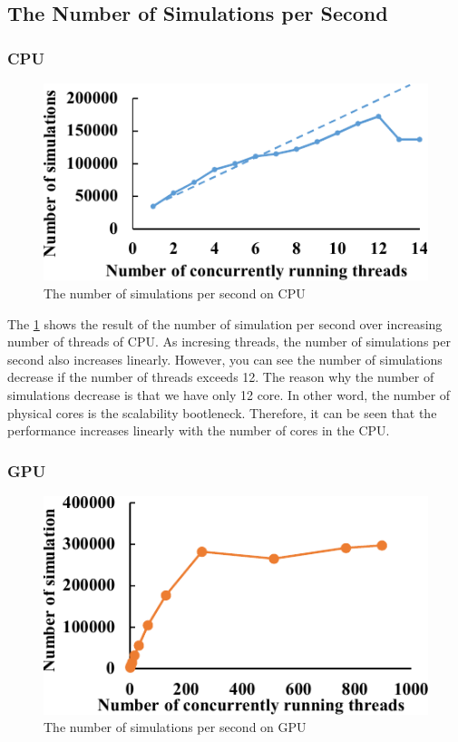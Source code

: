 \documentclass[conference]{IEEEtran}
\begin{document}
\subsection{The Number of Simulations per Second}
\subsubsection{CPU}
\begin{figure}
\includegraphics[width=0.95\columnwidth]{figures/cpu_num_simulation.pdf}
\caption{The number of simulations per second on CPU}
\label{fig:cpu_num_simulation}
\end{figure}

The \cref{fig:cpu_num_simulation} shows the result of the number of simulation per second over increasing number of threads of CPU. As incresing threads, the number of simulations per second also increases linearly. 
However, you can see the number of simulations decrease if the number of threads exceeds 12. 
The reason why the number of simulations decrease is that we have only 12 core. In other word, the number of physical cores is the scalability bootleneck. 
Therefore, it can be seen that the performance increases linearly with the number of cores in the CPU. 
\subsubsection{GPU}
\begin{figure}
\includegraphics[width=0.95\columnwidth]{figures/gpu_num_simulation.pdf}
\caption{The number of simulations per second on GPU}
\label{fig:gpu_num_simulation}
\end{figure}
\end{document}
